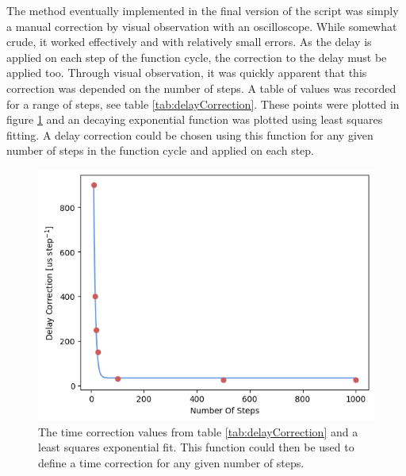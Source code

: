 \documentclass[%
 reprint,
 amsmath,amssymb,
 aps,
]{revtex4-2}
\begin{document}
        The method eventually implemented in the final version of the script was simply a manual correction by visual observation with an oscilloscope. While somewhat crude, it worked effectively and with relatively small errors. As the delay is applied on each step of the function cycle, the correction to the delay must be applied too. Through visual observation, it was quickly apparent that this correction was depended on the number of steps. A table of values was recorded for a range of steps, see table \ref{tab:delayCorrection}. These points were plotted in figure \ref{fig:delayCorrection} and an decaying exponential function was plotted using least squares fitting. A delay correction could be chosen using this function for any given number of steps in the function cycle and applied on each step.

        \begin{table}[]
        \caption{Table of time delay correction values for function generation using the DAC. $N$ is the number of steps in the function cycle, and $t_c$ is the time correction subtracted from the delay in each step.}
        \label{tab:delayCorrection}
        \end{table}

        \begin{figure}
            \includegraphics[width=0.9\columnwidth]{Images/delayCorrection.png}
            \caption{\label{fig:delayCorrection}The time correction values from table \ref{tab:delayCorrection} and a least squares exponential fit. This function could then be used to define a time correction for any given number of steps.}
        \end{figure}
\end{document}
